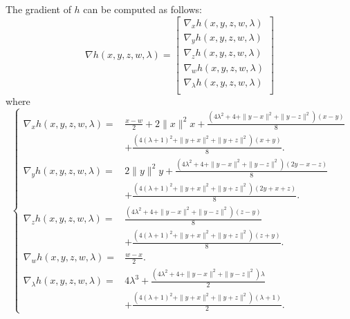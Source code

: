 \documentclass[3p]{elsarticle}
\begin{document}
The gradient of $h$ can be computed as follows:
\begin{equation}\label{eq:dh}
\nabla h(x,y,z,w,\lambda)  = \begin{bmatrix}
\nabla_x h(x,y,z,w,\lambda)\\
\nabla_y h(x,y,z,w,\lambda)\\
\nabla_z h(x,y,z,w,\lambda)\\
\nabla_w h(x,y,z,w,\lambda)\\
\nabla_{\lambda} h(x,y,z,w,\lambda)\\
\end{bmatrix}
\end{equation}
where
\begin{equation}\label{eq:dhforPdc}
\left\lbrace 
\begin{array}{ll}
\nabla_x h(x,y,z,w,\lambda) = &\frac{x-w}{2}+ 2\|x\|^2x + \frac{(4\lambda^2+4+\|y-x\|^2+\|y-z\|^2)(x-y)}{8} \\
&+ \frac{(4(\lambda+1)^2+\|y+x\|^2+\|y+z\|^2)(x+y)}{8}.\\
\nabla_y h(x,y,z,w,\lambda) = &2\|y\|^2y + \frac{(4\lambda^2+4+\|y-x\|^2+\|y-z\|^2)(2y-x-z)}{8} \\
&+ \frac{(4(\lambda+1)^2+\|y+x\|^2+\|y+z\|^2)(2y+x+z)}{8}.\\
\nabla_z h(x,y,z,w,\lambda) = & \frac{(4\lambda^2+4+\|y-x\|^2+\|y-z\|^2)(z-y)}{8} \\
&+ \frac{(4(\lambda+1)^2+\|y+x\|^2+\|y+z\|^2)(z+y)}{8}.\\
\nabla_w h(x,y,z,w,\lambda) = &\frac{w-x}{2}.\\
\nabla_{\lambda} h(x,y,z,w,\lambda) = &4\lambda^3 + \frac{(4\lambda^2+4+\|y-x\|^2+\|y-z\|^2)\lambda}{2} \\
&+ \frac{(4(\lambda+1)^2+\|y+x\|^2+\|y+z\|^2)(\lambda+1)}{2}.
\end{array}
\right. 
\end{equation}
\end{document}
